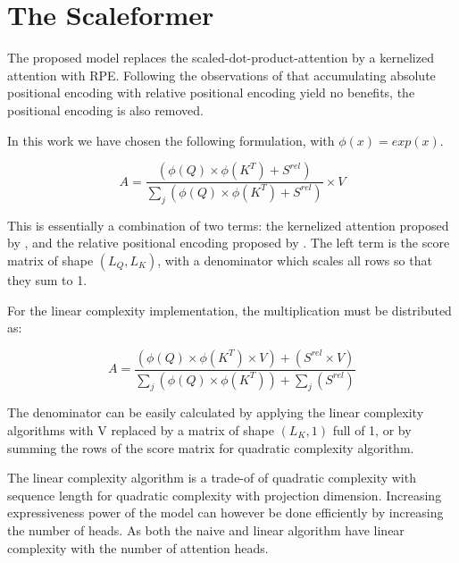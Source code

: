 \section{The Scaleformer}

The proposed model replaces the scaled-dot-product-attention by a
kernelized attention with RPE. Following the observations of
\citet{shaw2018selfattention} that
accumulating absolute positional encoding with relative positional
encoding yield no benefits, the positional encoding is also removed.

In this work we have chosen the following formulation, with $\phi(x) = exp(x)$.

\begin{equation}
A = \frac{\left( \phi(Q) \times \phi(K^T) + S^{rel} \right)}{\sum_j \left( \phi(Q) \times \phi(K^T) + S^{rel} \right)} \times V
\end{equation}

This is essentially a combination of two terms: the kernelized attention
proposed by  \citet{katharopoulos2020transformers}, and the relative positional encoding proposed by
\citet{shaw2018selfattention}. The left
term is the score matrix of shape $(L_Q, L_K)$, with a denominator
which scales all rows so that they sum to 1.

For the linear complexity implementation, the multiplication must be distributed as:

\begin{equation}
A = \frac{\left( \phi(Q) \times \phi(K^T) \times V \right) + \left( S^{rel} \times V\right)}{\sum_j \left( \phi(Q) \times \phi(K^T) \right) + \sum_j \left( S^{rel} \right)}
\end{equation}

The denominator can be easily calculated by applying the linear complexity algorithms with V replaced by a matrix of shape $(L_K, 1)$ full of 1, or by summing the rows of the score matrix for quadratic complexity algorithm.

The linear complexity algorithm is a trade-of of quadratic complexity with sequence length for quadratic complexity with projection dimension. Increasing expressiveness power of the model can however be done efficiently by increasing the number of heads. As both the naive and linear algorithm have linear complexity with the number of attention heads.

\endinput
